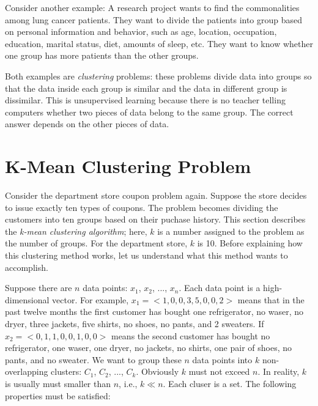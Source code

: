 Consider another example: A research project wants to find the
commonalities among lung cancer patients. They want to divide the
patients into group based on personal information and behavior, such
as age, location, occupation, education, marital status, diet, amounts
of sleep, etc. They want to know whether one group has more patients
than the other groups.

Both examples are {\it clustering} problems: these problems divide
data into groups so that the data inside each group is similar and the
data in different group is dissimilar.  This is unsupervised learning
because there is no teacher telling computers whether two pieces of
data belong to the same group.  The correct answer depends on the
other pieces of data.  

\section{K-Mean Clustering Problem}

Consider the department store coupon problem again. Suppose the store
decides to issue exactly ten types of coupons.  The problem becomes
dividing the customers into ten groups based on their puchase history.
This section describes the {\it k-mean clustering algorithm}; here,
$k$  is a number assigned to
the problem as the number of groups.  For the department store, $k$ is
10.  Before explaining how this clustering method works, let us
understand what this method wants to accomplish.

Suppose there are $n$ data points: $x_1$, $x_2$, ..., $x_n$. Each data
point is a high-dimensional vector.  For example, $x_1 = <1, 0, 0, 3,
5, 0, 0, 2>$ means that in the past twelve months the first customer
has bought one refrigerator, no waser, no dryer, three jackets, five
shirts, no shoes, no pants, and 2 sweaters.  If $x_2 = <0, 1, 1, 0, 0,
1, 0, 0>$ means the second customer has bought no refrigerator, one
waser, one dryer, no jackets, no shirts, one pair of shoes, no pants,
and no sweater.  We want to group these $n$ data points into $k$
non-overlapping clusters: $C_1$, $C_2$, ..., $C_k$. Obviously $k$ must
not exceed $n$. In reality, $k$ is usually must smaller than $n$,
i.e., $k \ll n$.  Each cluser is a set.   The following properties must be
satisfied:

